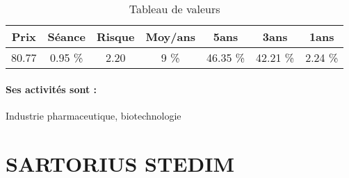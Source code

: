 \documentclass[11pt,a4paper]{report}%
\begin{document}
\begin{table}[H]
  \centering
    \begin{tabular}{|c|c|c|c|c|c|c|}
    \hline
    Prix & Séance & Risque  & Moy/ans & 5ans & 3ans & 1ans \\
    \hline
    80.77 &    0.95 \%    & 2.20 & 9 \% & 46.35 \% & 42.21 \% & 2.24 \% \\
    \hline
    \end{tabular}%
        \label{tab:table_SANOFI}%
      \caption{Tableau de valeurs}
\end{table}%

\paragraph{Ses activités sont : } Industrie pharmaceutique, biotechnologie 
    
    \newpage

\section{SARTORIUS STEDIM}
\end{document}
